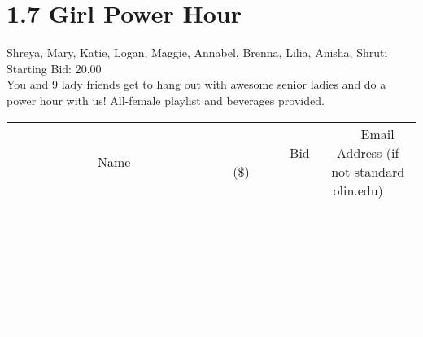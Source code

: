 \documentclass[11pt]{article}
\begin{document}
					\section*{1.7 Girl Power Hour}
					Shreya, Mary, Katie, Logan, Maggie, Annabel, Brenna, Lilia, Anisha, Shruti \\
					Starting Bid: 20.00 \\
					You and 9 lady friends get to hang out with awesome senior ladies and do a power hour with us! All-female playlist and beverages provided. \\
					[6ex]
					\begin{tabular}{c c c}
						~~~~~~~~~~~~~Name~~~~~~~~~~~~~ & ~~~~~~~~~Bid (\$)~~~~~~~~~ & ~~~Email Address (if not standard olin.edu)~~~ \\
				
 & & \\
\hline
 & & \\
\hline
 & & \\
\hline
 & & \\
\hline
 & & \\
\hline
 & & \\
\hline
 & & \\
\hline
 & & \\
\hline
 & & \\
\hline
 & & \\
\hline
 & & \\
\hline
 & & \\
\hline
 & & \\
\hline
 & & \\
\hline
 & & \\
\hline
 & & \\
\hline
 & & \\
\hline
 & & \\
\hline
 & & \\
\hline
 & & \\
\hline
 & & \\
\hline
 & & \\
\hline
 & & \\
\hline
 & & \\
\hline
 & & \\
\hline
 & & \\
\hline
					\end{tabular}
					\clearpage
				
\end{document}
